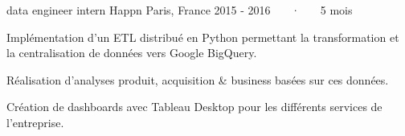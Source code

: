 \begin{cventries}
  \cventry
    {data engineer intern} %
    {Happn} %
    {Paris, France} %
    {2015 - 2016 ~~~·~~~ 5 mois} %
    {
      \begin{cvitems} %
        \item {Implémentation d'un ETL distribué en Python permettant la transformation et la centralisation de données vers Google BigQuery.}
        \item {Réalisation d'analyses produit, acquisition \& business basées sur ces données.}
        \item {Création de dashboards avec Tableau Desktop pour les différents services de l'entreprise.}
      \end{cvitems}
    }


\end{cventries}
